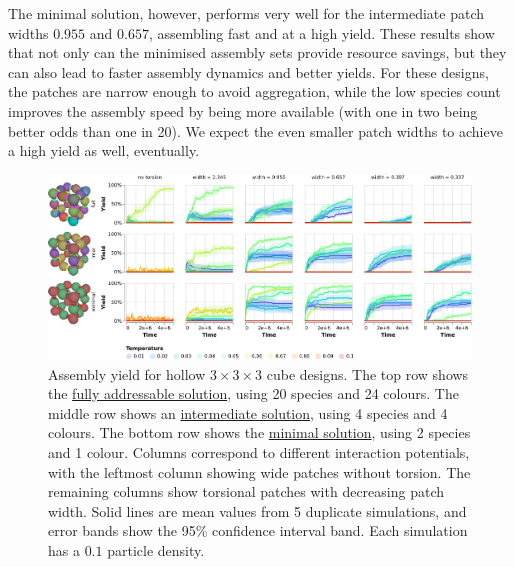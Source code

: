 The minimal solution, however, performs very well for the intermediate patch widths \(0.955\) and \(0.657\), assembling fast and at a high yield. These results show that not only can the minimised assembly sets provide resource savings, but they can also lead to faster assembly dynamics and better yields. For these designs, the patches are narrow enough to avoid aggregation, while the low species count improves the assembly speed by being more available (with one in two being better odds than one in 20). We expect the even smaller patch widths to achieve a high yield as well, eventually.

\begin{figure}[h]
    \centering
    \includegraphics[width=\linewidth]{figures/patchysim/cubePotentials.eps}
    \caption{Assembly yield for hollow \(3 \times 3 \times 3\) cube designs. The top row shows the \href{https://akodiat.github.io/polycubes/?assemblyMode=stochastic&rule=00040109020c000089110200001491010218000001018e1c002001259e000000a5290200002ca901b200000001019a30963401010200863801010200ba00013d02400000bd450200b600c5010248ae4c01010200ce00e101d20000000101ca5000000101c254de000159d600a25c010102000000d9610200}{fully addressable solution}, using 20 species and 24 colours. The middle row shows an \href{https://akodiat.github.io/polycubes/?assemblyMode=stochastic&rule=90000800000600040090000d000000008b8d000011860000}{intermediate solution}, using 4 species and 4 colours. The bottom row shows the \href{https://akodiat.github.io/polycubes/?assemblyMode=stochastic&rule=070000070500868700000000}{minimal solution}, using 2 species and 1 colour. Columns correspond to different interaction potentials, with the leftmost column showing wide patches without torsion. The remaining columns show torsional patches with decreasing patch width. Solid lines are mean values from 5 duplicate simulations, and error bands show the 95\% confidence interval band. Each simulation has a \(0.1\) particle density.}
    \label{fig:cubePotentials}
\end{figure}

